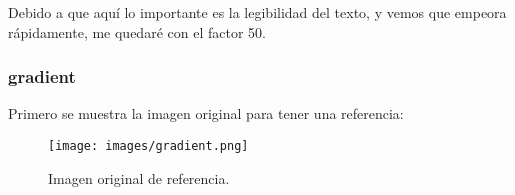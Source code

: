 \documentclass[12pt,a4paper]{article}
\begin{document}
Debido a que aquí lo importante es la legibilidad del texto, y vemos que empeora rápidamente, me quedaré con el factor 50.\\

\subsubsection{gradient}
Primero se muestra la imagen original para tener una referencia:
\begin{figure}[H]
    \centering
    \texttt{[image: images/gradient.png]}
    \caption[Referencia - gradient]{Imagen original de referencia.}
    
\end{figure}
    
    \vspace{0.5cm}
\end{document}
